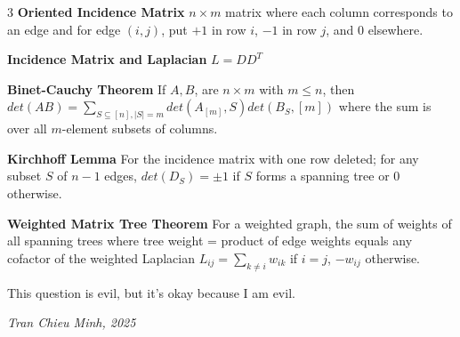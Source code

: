 \documentclass[10pt, landscape]{article}
\begin{document}
\begin{multicols*}{3}
\textbf{Oriented Incidence Matrix} $n\times m$ matrix where each column corresponds to an edge and for edge $(i,j)$, put $+1$ in row $i$, $-1$ in row $j$, and 0 elsewhere.

\textbf{Incidence Matrix and Laplacian} $L=DD^T$

\textbf{Binet-Cauchy Theorem} If $A, B$, are $n \times m$ with $m \leq n$, then $det(AB)=\sum_{S\subseteq [n], |S|=m} det(A_{[m]},S)det(B_S,[m])$ where the sum is over all $m$-element subsets of columns.

\textbf{Kirchhoff Lemma} For the incidence matrix with one row deleted; for any subset $S$ of $n-1$ edges, $det(D_S)=\pm 1$ if $S$ forms a spanning tree or 0 otherwise.

\textbf{Weighted Matrix Tree Theorem} For a weighted graph, the sum of weights of all spanning trees where tree weight = product of edge weights equals any cofactor of the weighted Laplacian $L_{ij}= \sum_{k \neq i} w_{ik}$ if $i=j$, $-w_{ij}$ otherwise.


\columnwidth
\epigraph{This question is evil, but it's okay because I am evil.}{\textit{Tran Chieu Minh, 2025}}

\end{multicols*}
\end{document}

